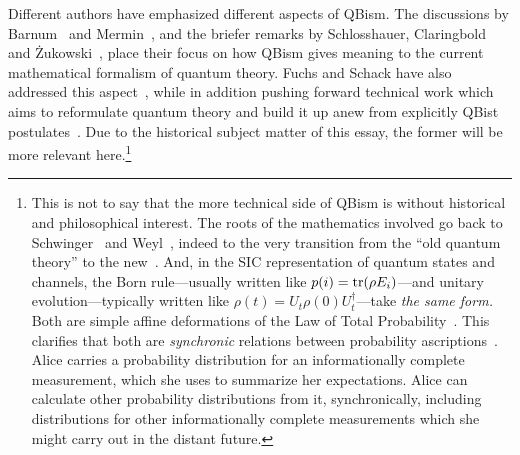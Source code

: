 \documentclass[aps,pra,superscriptaddress,12pt,tightenlines,nofootinbib]{revtex4}
\newcommand{\tr}{\hbox{tr}}
\begin{document}
Different authors have emphasized different aspects of QBism.  The
discussions by Barnum~\cite{Barnum2010} and Mermin~\cite{MerminPT,
  Mermin14, Mermin14b, Mermin-Vienna, Mermin-Bell}, and the briefer
remarks by Schlosshauer, Claringbold and
\.{Z}ukowski~\cite{Schlosshauer2014, Zukowski2015}, place their focus
on how QBism gives meaning to the current mathematical formalism of
quantum theory.  Fuchs and Schack have also addressed this
aspect~\cite{FuchsSchack2011}, while in addition pushing forward
technical work which aims to reformulate quantum theory and build it
up anew from explicitly QBist postulates~\cite{RMP}.  Due to the
historical subject matter of this essay, the former will be more
relevant here.\footnote{This is not to say that the more technical
  side of QBism is without historical and philosophical interest.  The
  roots of the mathematics involved go back to
  Schwinger~\cite{Schwinger1960} and Weyl~\cite[\S IV.D.14]{Weyl1931},
  indeed to the very transition from the ``old quantum theory'' to the
  new~\cite[pp.\ 2055--56, 2257--58, 2280]{Fuchs2014}.  And, in the
  SIC representation of quantum states and channels, the Born
  rule---usually written like $p(i) = \tr(\rho E_i)$---and unitary
  evolution---typically written like $\rho(t) = U_t \rho(0)
  U_t^\dag$---take \emph{the same form.}  Both are simple affine
  deformations of the Law of Total Probability~\cite{RMP}.  This
  clarifies that both are \emph{synchronic} relations between
  probability ascriptions~\cite{FuchsSchack2011}.  Alice carries a
  probability distribution for an informationally complete
  measurement, which she uses to summarize her expectations.  Alice
  can calculate other probability distributions from it,
  synchronically, including distributions for other informationally
  complete measurements which she might carry out in the distant
  future.}
\end{document}
